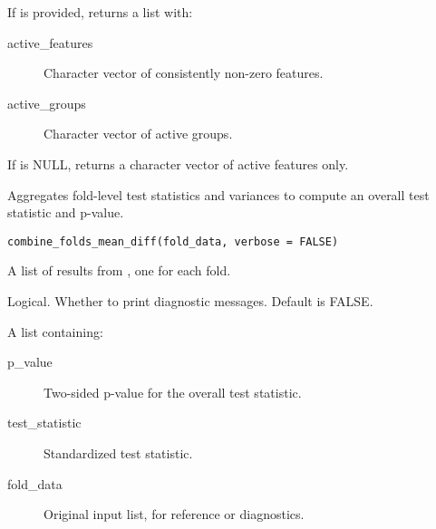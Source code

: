 \documentclass[a4paper]{book}
\begin{document}
%
\begin{Value}
If  is provided, returns a list with:
\begin{description}

\item[active\_features] Character vector of consistently non-zero features.
\item[active\_groups] Character vector of active groups.

\end{description}

If  is NULL, returns a character vector of active features only.
\end{Value}
%
\begin{Description}
Aggregates fold-level test statistics and variances to compute an overall test statistic and p-value.
\end{Description}
%
\begin{Usage}
\begin{verbatim}
combine_folds_mean_diff(fold_data, verbose = FALSE)
\end{verbatim}
\end{Usage}
%
\begin{Arguments}
\begin{ldescription}
\item[\code{fold\_data}] A list of results from , one for each fold.

\item[\code{verbose}] Logical. Whether to print diagnostic messages. Default is FALSE.
\end{ldescription}
\end{Arguments}
%
\begin{Value}
A list containing:
\begin{description}

\item[p\_value] Two-sided p-value for the overall test statistic.
\item[test\_statistic] Standardized test statistic.
\item[fold\_data] Original input list, for reference or diagnostics.

\end{description}

\end{Value}
\end{document}
